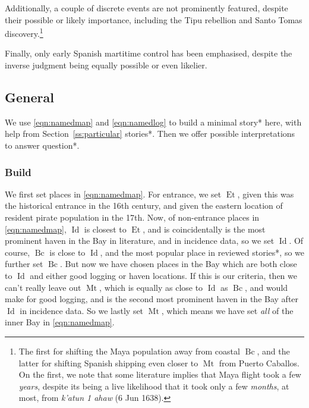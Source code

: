 \documentclass{amsart}
\newcommand{\forn}[1]{\textit{#1}} %
\DeclareMathOperator{\id}{Id} %
\DeclareMathOperator{\mt}{Mt} %
\DeclareMathOperator{\bc}{Bc} %
\DeclareMathOperator{\et}{Et} %
\theoremstyle{definition}
\theoremstyle{remark}
\begin{document}
		Additionally, a couple of discrete events are not prominently featured, despite their possible or likely importance, including the Tipu rebellion and Santo Tomas discovery.\footnote{The first for shifting the Maya population away from coastal \(\bc\), and the latter for shifting Spanish shipping even closer to \(\mt\) from Puerto Caballos. On the first, we note that some literature implies that Maya flight took a few \emph{years}, despite its being a live likelihood that it took only a few \emph{months}, at most, from \forn{k'atun 1 ahaw} (6 Jun 1638).}
		
		Finally, only early Spanish martitime control has been emphasised, despite the inverse judgment being equally possible or even likelier.
	\subsection{General}
	\label{ss:general}
	We use \ref{eqn:namedmap} and \ref{eqn:namedlog} to build a minimal story* here, with help from Section~\ref{ss:particular} stories*. Then we offer possible interpretations to answer question*.
		\subsubsection{Build}
		\label{sss:storybuild}
		We first set places in \ref{eqn:namedmap}. For entrance, we set \(\et\), given this was the historical entrance in the 16th century, and given the eastern location of resident pirate population in the 17th. Now, of non-entrance places in \ref{eqn:namedmap}, \(\id\) is closest to \(\et\), and is coincidentally is the most prominent haven in the Bay in literature, and in incidence data, so we set \(\id\). Of course, \(\bc\) is close to \(\id\), and the most popular place in reviewed stories*, so we further set \(\bc\). But now we have chosen places in the Bay which are both close to \(\id\) and either good logging or haven locations. If this is our criteria, then we can't really leave out \(\mt\), which is equally as close to \(\id\) as \(\bc\), and would make for good logging, and is the second most prominent haven in the Bay after \(\id\) in incidence data. So we lastly set \(\mt\), which means we have set \emph{all} of the inner Bay in \ref{eqn:namedmap}.
		
\end{document}
